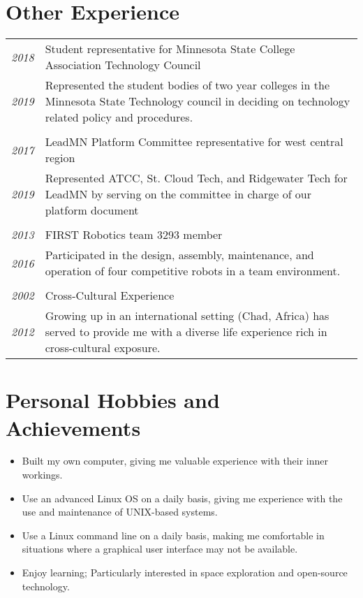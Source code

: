 \documentclass[letterpaper,10pt]{article}
\begin{document}
\section*{Other Experience}
	\begin{tabular}{R{2cm}|p{14cm}}
	\textsl{2018} & Student representative for Minnesota State College Association Technology Council\\
	\textsl{2019} & \footnotesize{Represented the student bodies of two year colleges in the Minnesota State Technology council in deciding on technology related policy and procedures.}\\
	\\
	\textsl{2017} & LeadMN Platform Committee representative for west central region\\
	\textsl{2019} & \footnotesize{Represented ATCC, St. Cloud Tech, and Ridgewater Tech for LeadMN by serving on the committee in charge of our platform document}\\
	\\
	\textsl{2013} & FIRST Robotics team 3293 member\\
	\textsl{2016} & \footnotesize{Participated in the design, assembly, maintenance, and operation of four competitive robots in a team environment.}\\
	\\
	\textsl{2002} & Cross-Cultural Experience\\
	\textsl{2012} &\footnotesize{Growing up in an international setting (Chad, Africa) has served to provide me with a diverse life experience rich in cross-cultural exposure.}\\
	\end{tabular}
\section*{Personal Hobbies and Achievements}
	\begin{itemize}
	\item Built my own computer, giving me valuable experience with their inner workings.
	\item Use an advanced Linux OS on a daily basis, giving me experience with the use and maintenance of UNIX-based systems.
	\item Use a Linux command line on a daily basis, making me comfortable in situations where a graphical user interface may not be available.
	\item Enjoy learning; Particularly interested in space exploration and open-source technology.
	\end{itemize}
{\let\thefootnote\relax{}} 
\end{document}
